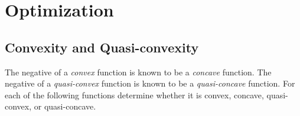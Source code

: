 \chapter{Optimization}


\section{Convexity and Quasi-convexity}
The negative of a \emph{convex} function is known to be a \emph{concave} function.
The negative of a \emph{quasi-convex} function is known to be a \emph{quasi-concave} function.
For each of the following functions determine whether it is convex, concave, quasi-convex, or quasi-concave.
